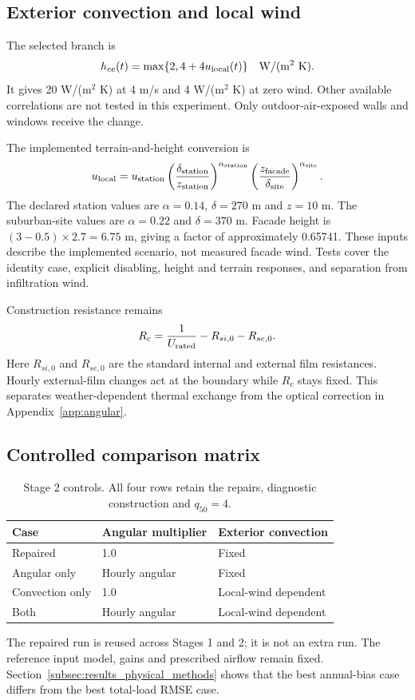 \subsection{Exterior convection and local wind}
\label{app:convection}
The selected branch is
\begin{equation}
h_{ce}(t)=\max\{2,4+4u_{\rm local}(t)\}\quad\text{W/(m$^2$ K)}.
\end{equation}
It gives 20 W/(m$^2$ K) at 4 m/s and 4 W/(m$^2$ K) at zero wind. Other available correlations are not tested in this experiment. Only outdoor-air-exposed walls and windows receive the change.

The implemented terrain-and-height conversion is
\begin{equation}
u_{\rm local}=u_{\rm station}
\left(\frac{\delta_{\rm station}}{z_{\rm station}}\right)^{\alpha_{\rm station}}
\left(\frac{z_{\rm facade}}{\delta_{\rm site}}\right)^{\alpha_{\rm site}}.
\end{equation}
The declared station values are $\alpha=0.14$, $\delta=270$ m and $z=10$ m. The suburban-site values are $\alpha=0.22$ and $\delta=370$ m. Facade height is $(3-0.5)\times2.7=6.75$ m, giving a factor of approximately 0.65741. These inputs describe the implemented scenario, not measured facade wind. Tests cover the identity case, explicit disabling, height and terrain responses, and separation from infiltration wind.

Construction resistance remains
\begin{equation}
R_c=\frac{1}{U_{\rm rated}}-R_{si,0}-R_{se,0}.
\end{equation}
Here $R_{si,0}$ and $R_{se,0}$ are the standard internal and external film resistances. Hourly external-film changes act at the boundary while $R_c$ stays fixed. This separates weather-dependent thermal exchange from the optical correction in Appendix~\ref{app:angular}.

\subsection{Controlled comparison matrix}
\label{app:physical_matrix}
\begin{table}[H]\centering\small
\caption{Stage 2 controls. All four rows retain the repairs, diagnostic construction and $q_{50}=4$.}\label{tab:bmethods}
\begin{tabularx}{\linewidth}{@{}YYY@{}}\toprule
Case & Angular multiplier & Exterior convection\\\midrule
Repaired & 1.0 & Fixed\\
Angular only & Hourly angular & Fixed\\
Convection only & 1.0 & Local-wind dependent\\
Both & Hourly angular & Local-wind dependent\\\bottomrule
\end{tabularx}\end{table}
The repaired run is reused across Stages 1 and 2; it is not an extra run. The reference input model, gains and prescribed airflow remain fixed. Section~\ref{subsec:results_physical_methods} shows that the best annual-bias case differs from the best total-load RMSE case.

